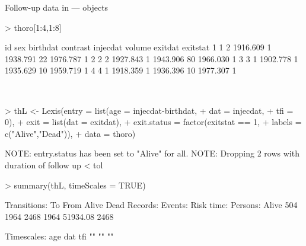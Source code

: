 \begin{frame}{Follow-up data in  ---  objects}
\begin{Schunk}
\begin{Sinput}
> thoro[1:4,1:8]
\end{Sinput}
\begin{Soutput}
  id sex birthdat contrast injecdat volume  exitdat exitstat
1  1   2 1916.609        1 1938.791     22 1976.787        1
2  2   2 1927.843        1 1943.906     80 1966.030        1
3  3   1 1902.778        1 1935.629     10 1959.719        1
4  4   1 1918.359        1 1936.396     10 1977.307        1
\end{Soutput}
\end{Schunk}
\ \\[-1em]
\begin{Schunk}
\begin{Sinput}
> thL <- Lexis(entry = list(age = injecdat-birthdat,
+                           dat = injecdat,
+                           tfi = 0),
+               exit = list(dat = exitdat),
+        exit.status = factor(exitstat == 1,
+                             labels = c("Alive","Dead")),
+               data = thoro)
\end{Sinput}
\begin{Soutput}
NOTE: entry.status has been set to "Alive" for all.
NOTE: Dropping  2  rows with duration of follow up < tol
\end{Soutput}
\begin{Sinput}
> summary(thL, timeScales = TRUE)
\end{Sinput}
\begin{Soutput}
Transitions:
     To
From    Alive Dead  Records:  Events: Risk time:  Persons:
  Alive   504 1964      2468     1964   51934.08      2468

Timescales:
age dat tfi 
 ""  ""  "" 
\end{Soutput}
\end{Schunk}
\end{frame}

